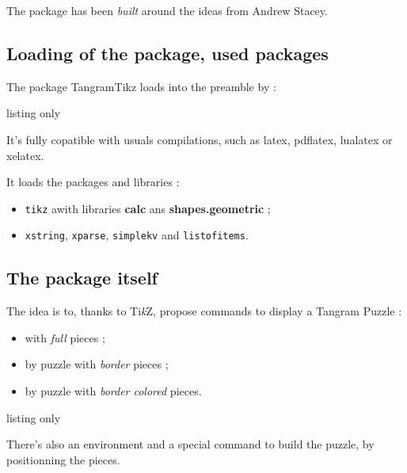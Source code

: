 \documentclass{article}
\providecommand\tikzlogo{Ti\textit{k}Z}
\let\TikZ\tikzlogo
\newcommand\Cle[1]{{\bfseries\sffamily\textlangle #1\textrangle}}
\begin{document}
\smallskip

The package has been \textit{built} around the ideas from Andrew Stacey.

\subsection{Loading of the package, used packages}

The package \textsf{TangramTikz} loads into the preamble by :

\begin{PresentationCode}{listing only}
\usepackage{TangramTikz}
\end{PresentationCode}

It's fully copatible with usuals compilations, such as \textsf{latex}, \textsf{pdflatex}, \textsf{lualatex} or \textsf{xelatex}.

\medskip

It loads the packages and libraries :

\begin{itemize}
	\item \texttt{tikz} awith libraries \Cle{calc} ans \Cle{shapes.geometric} ;
	\item \texttt{xstring}, \texttt{xparse}, \texttt{simplekv} and \texttt{listofitems}.
\end{itemize}

\subsection{The package itself}

The idea is to, thanks to \TikZ, propose \textsf{commands} to display a Tangram Puzzle :

\begin{itemize}
	\item with \textit{full} pieces ;
	\item by puzzle with \textit{border} pieces ;
	\item by puzzle with \textit{border colored} pieces.
\end{itemize}

\begin{PresentationCode}{listing only}
\end{PresentationCode}

There's also an \textsf{environment} and a special \textsf{command} to build the puzzle, by positionning the pieces.
\end{document}
